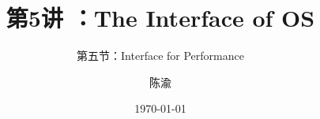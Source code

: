 


\title[第5讲]{第5讲 ：The Interface of OS} %
\subtitle{第五节：Interface for Performance}
\author{陈渝} %
\date{\today} %




\begin{frame}
\titlepage %
\end{frame}

